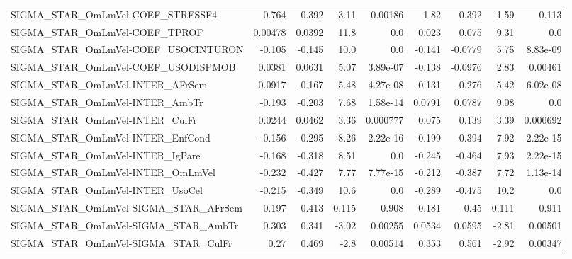 \begin{tabular}{lrrrrrrrr}
SIGMA\_STAR\_OmLmVel-COEF\_STRESSF4      &       0.764 &        0.392 &   -3.11 &  0.00186 &       1.82 &       0.392 &        -1.59 &         0.113 \\
SIGMA\_STAR\_OmLmVel-COEF\_TPROF         &     0.00478 &       0.0392 &    11.8 &      0.0 &      0.023 &       0.075 &         9.31 &           0.0 \\
SIGMA\_STAR\_OmLmVel-COEF\_USOCINTURON   &      -0.105 &       -0.145 &    10.0 &      0.0 &     -0.141 &     -0.0779 &         5.75 &      8.83e-09 \\
SIGMA\_STAR\_OmLmVel-COEF\_USODISPMOB    &      0.0381 &       0.0631 &    5.07 & 3.89e-07 &     -0.138 &     -0.0976 &         2.83 &       0.00461 \\
SIGMA\_STAR\_OmLmVel-INTER\_AFrSem       &     -0.0917 &       -0.167 &    5.48 & 4.27e-08 &     -0.131 &      -0.276 &         5.42 &      6.02e-08 \\
SIGMA\_STAR\_OmLmVel-INTER\_AmbTr        &      -0.193 &       -0.203 &    7.68 & 1.58e-14 &     0.0791 &      0.0787 &         9.08 &           0.0 \\
SIGMA\_STAR\_OmLmVel-INTER\_CulFr        &      0.0244 &       0.0462 &    3.36 & 0.000777 &      0.075 &       0.139 &         3.39 &      0.000692 \\
SIGMA\_STAR\_OmLmVel-INTER\_EnfCond      &      -0.156 &       -0.295 &    8.26 & 2.22e-16 &     -0.199 &      -0.394 &         7.92 &      2.22e-15 \\
SIGMA\_STAR\_OmLmVel-INTER\_IgPare       &      -0.168 &       -0.318 &    8.51 &      0.0 &     -0.245 &      -0.464 &         7.93 &      2.22e-15 \\
SIGMA\_STAR\_OmLmVel-INTER\_OmLmVel      &      -0.232 &       -0.427 &    7.77 & 7.77e-15 &     -0.212 &      -0.387 &         7.72 &      1.13e-14 \\
SIGMA\_STAR\_OmLmVel-INTER\_UsoCel       &      -0.215 &       -0.349 &    10.6 &      0.0 &     -0.289 &      -0.475 &         10.2 &           0.0 \\
SIGMA\_STAR\_OmLmVel-SIGMA\_STAR\_AFrSem  &       0.197 &        0.413 &   0.115 &    0.908 &      0.181 &        0.45 &        0.111 &         0.911 \\
SIGMA\_STAR\_OmLmVel-SIGMA\_STAR\_AmbTr   &       0.303 &        0.341 &   -3.02 &  0.00255 &     0.0534 &      0.0595 &        -2.81 &       0.00501 \\
SIGMA\_STAR\_OmLmVel-SIGMA\_STAR\_CulFr   &        0.27 &        0.469 &    -2.8 &  0.00514 &      0.353 &       0.561 &        -2.92 &       0.00347 \\

\end{tabular}
